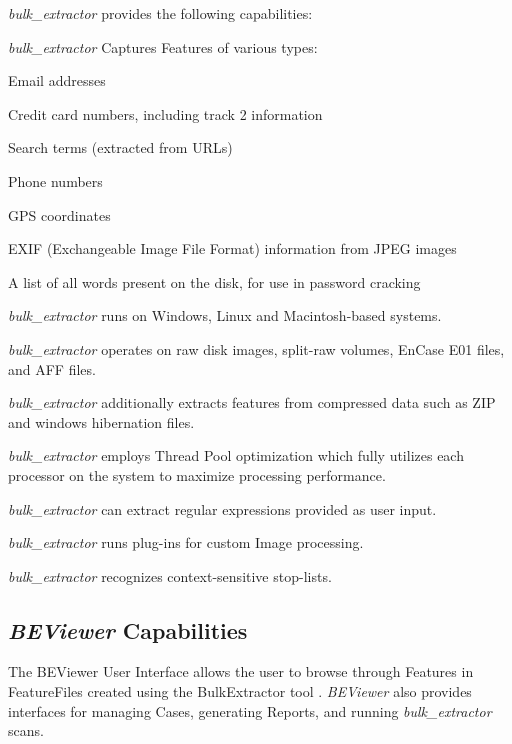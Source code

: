\documentclass[10pt,twoside]{article}
\newcommand{\bulk}{\emph{bulk\_extractor}\xspace}
\newcommand{\bev}{\emph{BEViewer}\xspace}
\begin{document}
\bulk provides the following capabilities:
\begin{compactitem}

\item \bulk Captures \glspl{Feature} of various types:
\begin{compactitem}
\item Email addresses
\item Credit card numbers, including track 2 information
\item Search terms (extracted from URLs)
\item Phone numbers
\item GPS coordinates
\item EXIF (Exchangeable Image File Format) information from JPEG
  images
\item A list of all words present on the disk, for use in
  password cracking
\end{compactitem}

\item \bulk runs on Windows, Linux and Macintosh-based systems.
\item \bulk operates on raw disk images, split-raw volumes, EnCase E01 files, and AFF files.
\item \bulk additionally extracts features
from compressed data such as ZIP and windows hibernation files.
\item \bulk employs Thread Pool optimization
which fully utilizes each processor on the system to maximize processing performance.
\item \bulk can extract regular expressions provided as user input.
\item \bulk runs plug-ins for custom Image processing.
\item \bulk recognizes context-sensitive stop-lists.
\end{compactitem}

\subsection{\bev Capabilities}
The \gls{BEViewer} User Interface allows the user
to browse through \glspl{Feature} in \glspl{FeatureFile} created
using the \gls{BulkExtractor} tool \cite{garfinkel:bulk-extractor}.
\bev also provides interfaces for managing \glspl{Case}, generating \glspl{Report},
and running \bulk scans.
\end{document}
